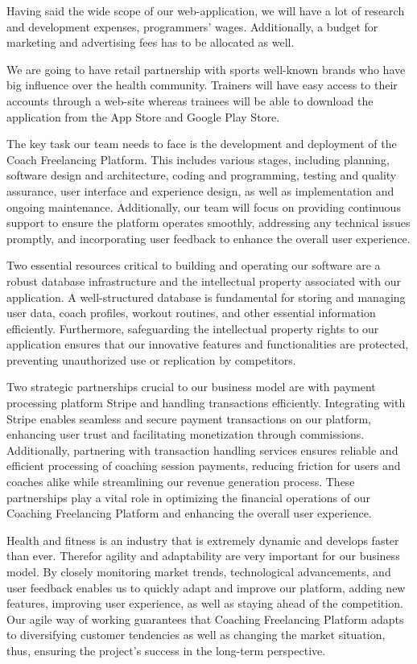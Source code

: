 \documentclass[12pt]{report}
\begin{document}
Having said the wide scope of our web-application, we will have a lot of research and development expenses, programmers’ wages. Additionally, a budget for marketing and advertising fees has to be allocated as well. 

We are going to have retail partnership with sports well-known brands who have big influence over the health community. Trainers will have easy access to their accounts through a web-site whereas trainees will be able to download the application from the App Store and Google Play Store. 

The key task our team needs to face is the development and deployment of the Coach Freelancing Platform. This includes various stages, including planning, software design and architecture, coding and programming, testing and quality assurance, user interface and experience design, as well as implementation and ongoing maintenance. Additionally, our team will focus on providing continuous support to ensure the platform operates smoothly, addressing any technical issues promptly, and incorporating user feedback to enhance the overall user experience.

Two essential resources critical to building and operating our software are a robust database infrastructure and the intellectual property associated with our application. A well-structured database is fundamental for storing and managing user data, coach profiles, workout routines, and other essential information efficiently. Furthermore, safeguarding the intellectual property rights to our application ensures that our innovative features and functionalities are protected, preventing unauthorized use or replication by competitors.

Two strategic partnerships crucial to our business model are with payment processing platform Stripe and handling transactions efficiently. Integrating with Stripe enables seamless and secure payment transactions on our platform, enhancing user trust and facilitating monetization through commissions. Additionally, partnering with transaction handling services ensures reliable and efficient processing of coaching session payments, reducing friction for users and coaches alike while streamlining our revenue generation process. These partnerships play a vital role in optimizing the financial operations of our Coaching Freelancing Platform and enhancing the overall user experience.

Health and fitness is an industry that is extremely dynamic and develops faster than ever. Therefor agility and adaptability are very important for our business model. By closely monitoring market trends, technological advancements, and user feedback enables us to quickly adapt and improve our platform, adding new features, improving user experience, as well as staying ahead of the competition. Our agile way of working guarantees that Coaching Freelancing Platform adapts to diversifying customer tendencies as well as changing the market situation, thus, ensuring the project’s success in the long-term perspective.
\end{document}

